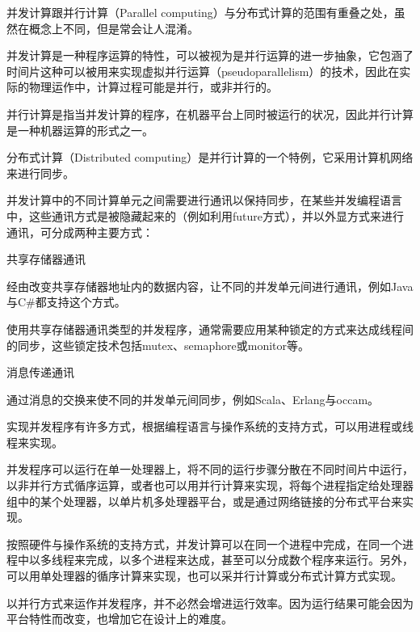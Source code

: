 并发计算跟并行计算（Parallel computing）与分布式计算的范围有重叠之处，虽然在概念上不同，但是常会让人混淆。

\begin{compactitem}
\item 并发计算是一种程序运算的特性，可以被视为是并行运算的进一步抽象，它包涵了时间片这种可以被用来实现虚拟并行运算（pseudoparallelism）的技术，因此在实际的物理运作中，计算过程可能是并行，或非并行的。

\item 并行计算是指当并发计算的程序，在机器平台上同时被运行的状况，因此并行计算是一种机器运算的形式之一。

\item 分布式计算（Distributed computing）是并行计算的一个特例，它采用计算机网络来进行同步。
\end{compactitem}


并发计算中的不同计算单元之间需要进行通讯以保持同步，在某些并发编程语言中，这些通讯方式是被隐藏起来的（例如利用future方式），并以外显方式来进行通讯，可分成两种主要方式：

\begin{compactenum}
\item 共享存储器通讯

经由改变共享存储器地址内的数据内容，让不同的并发单元间进行通讯，例如Java与C\#都支持这个方式。

使用共享存储器通讯类型的并发程序，通常需要应用某种锁定的方式来达成线程间的同步，这些锁定技术包括mutex、semaphore或monitor等。

\item 消息传递通讯

通过消息的交换来使不同的并发单元间同步，例如Scala、Erlang与occam。

\end{compactenum}



实现并发程序有许多方式，根据编程语言与操作系统的支持方式，可以用进程或线程来实现。

并发程序可以运行在单一处理器上，将不同的运行步骤分散在不同时间片中运行，以非并行方式循序运算，或者也可以用并行计算来实现，将每个进程指定给处理器组中的某个处理器，以单片机多处理器平台，或是通过网络链接的分布式平台来实现。

按照硬件与操作系统的支持方式，并发计算可以在同一个进程中完成，在同一个进程中以多线程来完成，以多个进程来达成，甚至可以分成数个程序来运行。另外，可以用单处理器的循序计算来实现，也可以采并行计算或分布式计算方式实现。

以并行方式来运作并发程序，并不必然会增进运行效率。因为运行结果可能会因为平台特性而改变，也增加它在设计上的难度。

